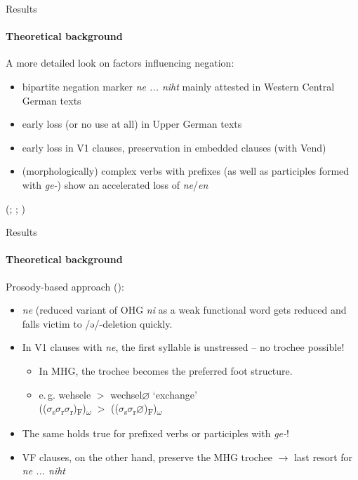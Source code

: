 \documentclass[xcolor=table, compress, %
handout
]{beamer}
\begin{document}
\begin{frame}{Results}
\framesubtitle{Theoretical background}

A more detailed look on factors influencing negation:

\begin{itemize}
    \item bipartite negation marker \textit{ne ... niht} mainly attested in Western Central German texts 
    \item early loss (or no use at all) in Upper German texts
    \item early loss in V1 clauses, preservation in embedded clauses (with Vend)
    \item (morphologically) complex verbs with prefixes (as well as participles formed with \textit{ge-}) show an accelerated loss of \textit{ne}/\textit{en}
\end{itemize}

{\tiny (\citealt{behaghel18,Gaertner1977,Pickl2017}; \citealt{schueler16,schueler17}; \citealt{hrbek21})}

\end{frame}


\begin{frame}{Results}
\framesubtitle{Theoretical background}

Prosody-based approach (\citealt{HertelimErscheinen}):

\begin{itemize}
    \item \textit{ne} (reduced variant of OHG \textit{ni} as a weak functional word gets reduced and falls victim to /ə/-deletion quickly.
    \item In V1 clauses with \textit{ne}, the first syllable is unstressed – no trochee possible!
    \begin{itemize}
    \item In MHG, the trochee becomes the preferred foot structure.
    \item e.\,g. wehsele $>$  wechsel\alert{$\varnothing$} ‘exchange’\\
(($\sigma$\textsubscript{s}$\sigma$\textsubscript{r}\alert{$\sigma$\textsubscript{r}})\textsubscript{F})\textsubscript{$\omega$} $>$   (($\sigma$\textsubscript{s}$\sigma$\textsubscript{r}\alert{$\varnothing$})\textsubscript{F})\textsubscript{$\omega$}
    \end{itemize}
    \item The same holds true for prefixed verbs or participles with \textit{ge-}!
    \item VF clauses, on the other hand, preserve the MHG trochee $\rightarrow$ last resort for \textit{ne ... niht}
\end{itemize}

\end{frame}
\end{document}
